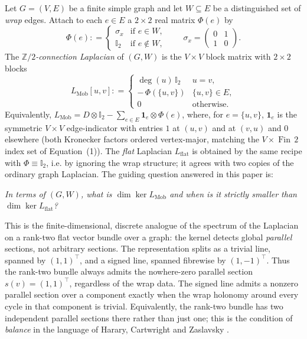 \documentclass[11pt,a4paper]{amsart}
\theoremstyle{plain}
\theoremstyle{definition}
\theoremstyle{remark}
\DeclareMathOperator{\Ker}{ker}
\newcommand{\ZZ}{\mathbb{Z}}
\newcommand{\II}{\mathbb{I}}
\newcommand{\defeq}{\mathrel{\mathop:}=}
\begin{document}
Let $G=(V,E)$ be a finite simple graph and let $W\subseteq E$ be
a distinguished set of \emph{wrap} edges. Attach to each
$e\in E$ a $2\times 2$ real matrix $\Phi(e)$ by
\[
  \Phi(e) \defeq \begin{cases} \sigma_x & \text{if } e\in W,\\
    \II_2 & \text{if } e\notin W, \end{cases}
\qquad
  \sigma_x = \begin{pmatrix}0&1\\1&0\end{pmatrix}.
\]
The \emph{$\ZZ/2$-connection Laplacian} of $(G,W)$ is the
$V\times V$ block matrix with $2\times 2$ blocks
\begin{equation}\label{eq:connection-laplacian}
  L_{\operatorname{Mob}}[u,v] \defeq
    \begin{cases}
      \deg(u)\,\II_2 & u=v,\\
      -\,\Phi(\{u,v\}) & \{u,v\}\in E,\\
      0 & \text{otherwise.}
    \end{cases}
\end{equation}
Equivalently, $L_{\operatorname{Mob}} = D\otimes \II_2 -
\sum_{e\in E} \mathbf{1}_e\otimes \Phi(e)$, where, for $e=\{u,v\}$,
$\mathbf{1}_e$ is the symmetric $V\times V$ edge-indicator with entries
$1$ at $(u,v)$ and at $(v,u)$ and $0$ elsewhere (both Kronecker factors ordered
vertex-major, matching the $V\times \operatorname{Fin}\,2$ index set of
Equation~(1)).
The \emph{flat} Laplacian $L_{\operatorname{flat}}$ is obtained by
the same recipe with $\Phi\equiv \II_2$, i.e. by ignoring the wrap
structure; it agrees with two copies of the ordinary graph Laplacian.
The guiding question answered in this paper is:

\begin{center}
  \emph{In terms of $(G,W)$, what is $\dim\Ker L_{\operatorname{Mob}}$
  and when is it strictly smaller than $\dim\Ker L_{\operatorname{flat}}$?}
\end{center}

This is the finite-dimensional, discrete analogue of the spectrum of
the Laplacian on a rank-two flat vector bundle over a graph: the
kernel detects global \emph{parallel} sections, not arbitrary sections.
The representation splits as a trivial line, spanned by $(1,1)^\top$,
and a signed line, spanned fibrewise by $(1,-1)^\top$. Thus the
rank-two bundle always admits the nowhere-zero parallel section
$s(v)=(1,1)^\top$, regardless of the wrap data. The signed line admits
a nonzero parallel section over a component exactly when the wrap
holonomy around every cycle in that component is trivial. Equivalently,
the rank-two bundle has two independent parallel sections there rather
than just one; this is the condition of
\emph{balance} in the language of Harary, Cartwright and Zaslavsky
\cite{HararyCartwright, Zaslavsky82}.
\end{document}
